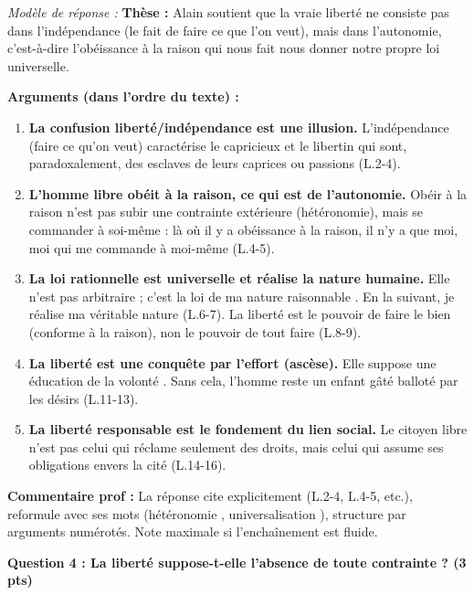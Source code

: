 \documentclass[11pt]{article}
\newcommand{\cle}[1]{{\popxbold\color{popdark}#1}}
\begin{document}
\begin{exoresolu}
\emph{Modèle de réponse :}
\og \textbf{Thèse :} Alain soutient que la vraie liberté ne consiste pas dans l'indépendance (le fait de faire ce que l'on veut), mais dans l'\cle{autonomie}, c'est-à-dire l'obéissance à la raison qui nous fait nous donner notre propre loi universelle.

\textbf{Arguments (dans l'ordre du texte) :}
\begin{enumerate}
    \item \textbf{La confusion liberté/indépendance est une illusion.} L'indépendance (faire ce qu'on veut) caractérise le capricieux et le libertin qui sont, paradoxalement, des \og esclaves \fg de leurs caprices ou passions (L.2-4).
    \item \textbf{L'homme libre obéit à la raison, ce qui est de l'autonomie.} Obéir à la raison n'est pas subir une contrainte extérieure (\cle{hétéronomie}), mais se commander à soi-même : \og là où il y a obéissance à la raison, il n'y a que moi, moi qui me commande à moi-même \fg (L.4-5).
    \item \textbf{La loi rationnelle est universelle et réalise la nature humaine.} Elle n'est pas arbitraire ; c'est la \og loi de ma nature raisonnable \fg. En la suivant, \og je réalise ma véritable nature \fg (L.6-7). La liberté est le \og pouvoir de faire le bien \fg (conforme à la raison), non le pouvoir de tout faire (L.8-9).
    \item \textbf{La liberté est une conquête par l'effort (\cle{ascèse}).} Elle suppose une \og éducation de la volonté \fg. Sans cela, l'homme reste un \og enfant gâté \fg balloté par les désirs (L.11-13).
    \item \textbf{La liberté responsable est le fondement du lien social.} Le citoyen libre n'est pas celui qui réclame seulement des droits, mais celui qui \og assume ses obligations envers la cité \fg (L.14-16).
\end{enumerate} \fg

\textbf{Commentaire prof :} La réponse cite explicitement (L.2-4, L.4-5, etc.), reformule avec ses mots (\og hétéronomie \fg, \og universalisation \fg), structure par arguments numérotés. Note maximale si l'enchaînement est fluide.

\vspace{0.5cm}
\textbf{Question 4 : \og La liberté suppose-t-elle l'absence de toute contrainte ? \fg (3 pts)}


\end{exoresolu}
\end{document}

